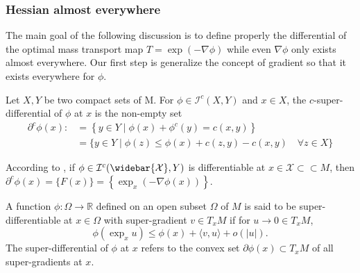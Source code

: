 \subsubsection{Hessian almost everywhere}
The main goal of the following discussion is to define properly the differential
of the optimal mass transport map $T = \exp (- \nabla \phi)$ while even $ \nabla \phi$ only exists almost everywhere.
Our first step is generalize the concept of gradient
so that it exists everywhere for $\phi$.
\begin{defn}
	Let \( X , Y \) be two compact sets of M. For \( \phi \in \mathcal { I } ^ { c } ( X , Y ) \)
	and \( x \in X \), the \( c \)-super-differential of \( \phi \) at \( x \) is the non-empty set
	\begin{align}
		\partial ^ { c } \phi ( x ) : & = \left\{ y \in Y \mid \phi ( x ) + \phi ^ { c } ( y ) = c ( x , y ) \right\}                     \\
		                              & = \{ y \in Y \mid \phi ( z ) \leq \phi ( x ) + c ( z , y ) - c ( x , y ) \quad \forall z \in X \}
		\label{equa:c-super-differential}
	\end{align}
\end{defn}

\begin{example} 
	\label{example:minimizer_differentiable}
	According to ,
	if \( \phi \in \mathcal { I } ^ { c } ( \widebar {\mathcal{X} } , Y ) \) is differentiable at
	\( x \in \mathcal { X } \subset \subset M \),
	then \( \partial ^ { c } \phi ( x ) = \{ F ( x ) \} = \left\{ \exp _ { x } ( - \nabla \phi ( x ) ) \right\} \).
\end{example}

\begin{defn}
	A function \( \phi : \Omega \rightarrow \mathbb { R } \) defined on an open subset \( \Omega \) of \( M \)
	is said to be super-differentiable at \( x \in \Omega \) with super-gradient \( v \in T _ { x } M \) if for
	\( u \rightarrow 0 \in T _ { x } M \),
	\begin{equation}
		\label{equa:super-differential}
		\phi \left( \exp _ { x } u \right) \leq \phi ( x ) + \langle v , u \rangle + o ( | u | ).
	\end{equation}
	The super-differential of \( \phi \) at \( x \) refers to
	the convex set \( \partial \phi ( x ) \subset T _ { x } M \) of all super-gradients at \( x \).
\end{defn}

